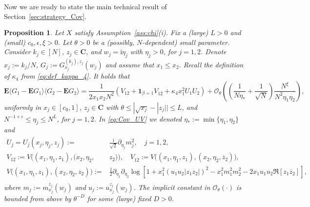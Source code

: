 \documentclass[10pt]{amsart}
\newtheorem{proposition}[theorem]{Proposition}
\numberwithin{equation}{section}
\newcommand{\E}{\mathbf{E}}
\newcommand{\C}{\mathbf{C}}
\newcommand{\ii}{\mathrm{i}}
\begin{document}
Now we are ready to state the main technical result of Section~\ref{sec:strategy_Cov}.

\begin{proposition}\label{prop:underline_comp} Let $X$ satisfy Assumption~\ref{ass:chi}(i). Fix a (large) $L>0$ and (small) $c_0,\epsilon,\xi>0$. Let $\theta>0$ be a (possibly, $N$-dependent) small parameter. Consider $k_j\in [N]$, $z_j\in\C$, and $w_j=\ii\eta_j$ with $\eta_j>0$, for $j=1,2$. Denote $x_j:=k_j/N$, $G_j:=G^{(k_j),z_j}_{x_j}(w_j)$ and assume that $x_1\le x_2$. Recall the definition of $\kappa_4$ from \eqref{eq:def_kappa_4}. It holds that
\begin{equation}
\E \langle G_1-\E G_1\rangle \langle G_2-\E G_2\rangle = \frac{1}{2x_1x_2N^2}\left(V_{12}+\bm{1}_{\beta=1}V_{1\overline{2}}+\kappa_4 x_1^2 U_1U_2\right) + \mathcal{O}_\theta\left(\left(\frac{1}{N\eta_*}+\frac{1}{\sqrt{N}}\right)\frac{N^\xi}{N^2\eta_1\eta_2}\right),
\label{eq:Cov_UV}
\end{equation}
uniformly in $x_j\in [c_0,1]$, $z_j\in\C$ with $\theta\le |\sqrt{x_j}-|z_j||\le L$, and $N^{-1+\epsilon}\le \eta_j\le N^L$, for $j=1,2$. In \eqref{eq:Cov_UV} we denoted $\eta_*:=\min\{\eta_1,\eta_2\}$ and
\begin{equation}
\begin{split}
U_j=U_j(x_j,\eta_j,z_j):=&\frac{\ii}{\sqrt{2}}\partial_{\eta_j}m_j^2,\quad j=1,2,\\
V_{12}:=V\big((x_1,\eta_1,z_1),(x_2,\eta_2,&z_2)\big),\quad V_{1\overline{2}}:=V\big((x_1,\eta_1,z_1),(x_2,\eta_2,\overline{z}_2)\big),\\ 
V\big((x_1,\eta_1,z_1),(x_2,\eta_2,z_2)\big):=&\frac{1}{2}\partial_{\eta_1}\partial_{\eta_2}\log \left[1+x_1^2\left(u_1u_2|z_1z_2|\right)^2 -x_1^2m_1^2m_2^2 -2x_1u_1u_2\Re [z_1\overline{z}_2]\right],\\
\end{split}
\label{eq:def_UV}
\end{equation}
where $m_j:=m^{z_j}_{x_j}(w_j)$ and $u_j:=u^{z_j}_{x_j}(w_j)$.
The implicit constant in $\mathcal{O}_\theta(\cdot)$ is bounded from above by $\theta^{-D}$ for some (large) fixed $D>0$. 
\end{proposition}
\end{document}
